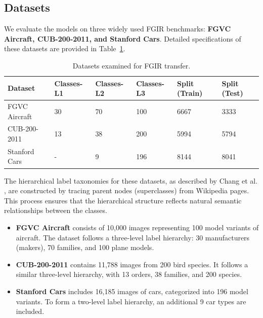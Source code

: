 \documentclass[10pt,twocolumn]{article}
\begin{document}
\subsection{Datasets}
We evaluate the models on three widely used FGIR benchmarks: \textbf{FGVC Aircraft\cite{maji_fine-grained_2013}, CUB-200-2011\cite{wah_caltech-ucsd_2011}, and Stanford Cars\cite{krause_collecting_nodate}}. Detailed specifications of these datasets are provided in Table~\ref{tab:dataset}.
\begin{table}[ht]
    \centering
    \small
    \begin{tabularx}{\linewidth}{|l|XXXXX|}
    \hline
    Dataset       & Classes-L1 & Classes-L2 & Classes-L3 & Split (Train) & Split (Test) \\ \hline
    FGVC Aircraft & 30         & 70         & 100        & 6667          & 3333         \\
    CUB-200-2011  & 13         & 38         & 200        & 5994          & 5794         \\
    Stanford Cars & -           & 9          & 196        & 8144          & 8041         \\ \hline
    \end{tabularx}
    \caption{Datasets examined for FGIR transfer.}
    \label{tab:dataset}
\end{table}

The hierarchical label taxonomies for these datasets, as described by
Chang et al. \cite{chang_your_2021}, are constructed by tracing parent nodes (superclasses) from Wikipedia pages. This process ensures that the hierarchical structure reflects natural semantic relationships between the classes.

\begin{itemize} [topsep=3pt, itemsep=2pt, parsep=1pt]
\item \textbf{FGVC Aircraft} consists of 10,000 images representing 100 model variants of aircraft. The dataset follows a three-level label hierarchy: 30 manufacturers (makers), 70 families, and 100 plane models.
\item \textbf{CUB-200-2011} contains 11,788 images from 200 bird species. It follows a similar three-level hierarchy, with 13 orders, 38 families, and 200 species.
\item \textbf{Stanford Cars} includes 16,185 images of cars, categorized into 196 model variants. To form a two-level label hierarchy, an additional 9 car types are included.
\end{itemize}
\end{document}
